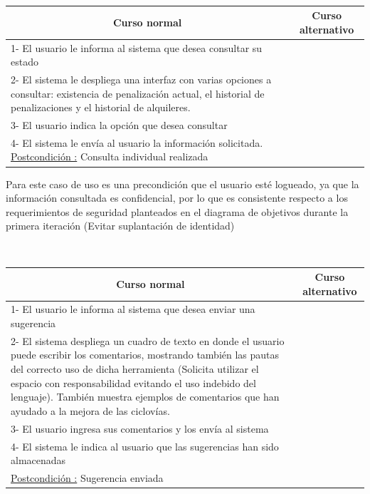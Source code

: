 ~

\begin{center}
    \centering
    \begin{tabular}{ | p{11cm} | p{6cm} | }
    	\multicolumn{1}{c}{\cellcolor{black!30}\textbf{Curso normal}} & 
    	\multicolumn{1}{c}{\cellcolor{black!30}\textbf{Curso alternativo}} \\
		\hline
		1- El usuario le informa al sistema que desea consultar su estado & \\ \hline
		2- El sistema le despliega una interfaz con varias opciones a consultar:
		existencia de penalización actual, el historial de 
		penalizaciones y el historial de alquileres. & \\ \hline
		3- El usuario indica la opción que desea consultar & \\ \hline
		4- El sistema le envía al usuario la información solicitada.
		\underline{Postcondición :} Consulta individual realizada & \\ \hline
    \end{tabular}
\end{center}

Para este caso de uso es una precondición que el usuario esté logueado, ya que la información consultada es confidencial, por
lo que es consistente respecto a los requerimientos de seguridad planteados en el diagrama de objetivos durante la primera 
iteración (Evitar suplantación de identidad)

~

\begin{center}
    \centering
    \begin{tabular}{ | p{11cm} | p{6cm} | }
    	\multicolumn{1}{c}{\cellcolor{black!30}\textbf{Curso normal}} & 
    	\multicolumn{1}{c}{\cellcolor{black!30}\textbf{Curso alternativo}} \\
		\hline
		1- El usuario le informa al sistema que desea enviar una sugerencia & \\ \hline
		2- El sistema despliega un cuadro de texto en donde el usuario puede escribir los comentarios,
		mostrando también las pautas del correcto uso de dicha herramienta (Solicita
		utilizar el espacio con
		responsabilidad evitando el uso indebido del lenguaje).
		También muestra ejemplos de comentarios que han ayudado a la mejora de las ciclovías. & \\ \hline
		3- El usuario ingresa sus comentarios y los envía al sistema & \\ \hline
		4- El sistema le indica al usuario que las sugerencias han sido almacenadas & \\ \hline
		\underline{Postcondición :} Sugerencia enviada & \\ \hline
    \end{tabular}
\end{center}




